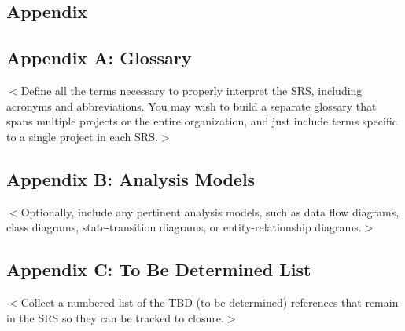 \begin{appendices}
	\chapter{Appendix}
	\section{Appendix A: Glossary}
	$<$Define all the terms necessary to properly interpret the SRS, including 
	acronyms and abbreviations. You may wish to build a separate glossary that spans 
	multiple projects or the entire organization, and just include terms specific to 
	a single project in each SRS.$>$
	
	\section{Appendix B: Analysis Models}
	$<$Optionally, include any pertinent analysis models, such as data flow 
	diagrams, class diagrams, state-transition diagrams, or entity-relationship 
	diagrams.$>$
	
	\section{Appendix C: To Be Determined List}
	$<$Collect a numbered list of the TBD (to be determined) references that remain 
	in the SRS so they can be tracked to closure.$>$
\end{appendices}